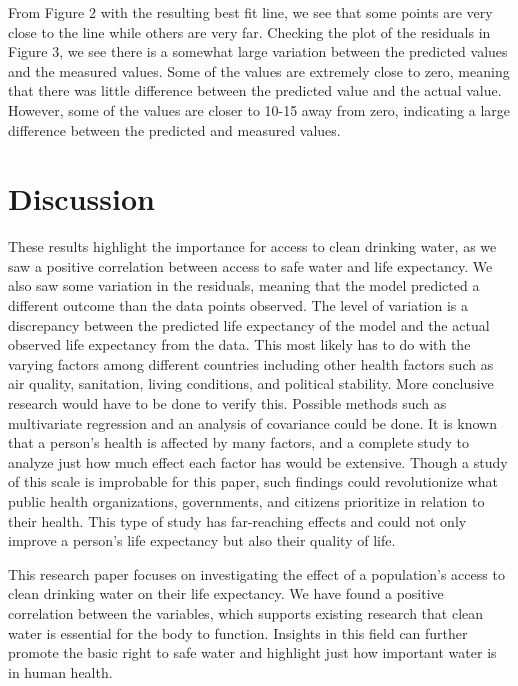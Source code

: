 \documentclass[12pt]{article}
\begin{document}
\vspace{15pt}

\noindent
From Figure 2 with the resulting best fit line, we see that some points are very close to the line while others are very far. Checking the plot of the residuals in Figure 3, we see there is a somewhat large variation between the predicted values and the measured values. Some of the values are extremely close to zero, meaning that there was little difference between the predicted value and the actual value. However, some of the values are closer to 10-15 away from zero, indicating a large difference between the predicted and measured values.

\section{Discussion}

\noindent
These results highlight the importance for access to clean drinking water, as we saw a positive correlation between access to safe water and life expectancy. We also saw some variation in the residuals, meaning that the model predicted a different outcome than the data points observed. The level of variation is a discrepancy between the predicted life expectancy of the model and the actual observed life expectancy from the data. This most likely has to do with the varying factors among different countries including other health factors such as air quality, sanitation, living conditions, and political stability. More conclusive research would have to be done to verify this. Possible methods such as multivariate regression and an analysis of covariance could be done. It is known that a person's health is affected by many factors, and a complete study to analyze just how much effect each factor has would be extensive. Though a study of this scale is improbable for this paper, such findings could revolutionize what public health organizations, governments, and citizens prioritize in relation to their health. This type of study has far-reaching effects and could not only improve a person's life expectancy but also their quality of life.

\vspace{15pt}

\noindent
This research paper focuses on investigating the effect of a population's access to clean drinking water on their life expectancy. We have found a positive correlation between the variables, which supports existing research that clean water is essential for the body to function. Insights in this field can further promote the basic right to safe water and highlight just how important water is in human health.


\newpage



\end{document}
